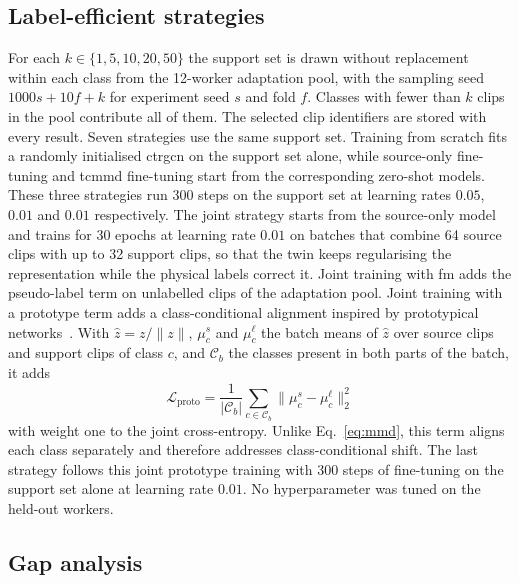 \documentclass[Afour,sagev,times]{sagej}
\begin{document}
\subsection{Label-efficient strategies}

For each $k\in\{1,5,10,20,50\}$ the support set is drawn without replacement
within each class from the 12-worker adaptation pool, with the sampling seed
$1000s+10f+k$ for experiment seed $s$ and fold $f$. Classes with fewer than $k$
clips in the pool contribute all of them. The selected clip identifiers are
stored with every result. Seven strategies use the same support set. Training
from scratch fits a randomly initialised \ac{ctrgcn} on the support set alone,
while source-only fine-tuning and \ac{tcmmd} fine-tuning start from the
corresponding zero-shot models. These three strategies run 300 steps on the
support set at learning rates $0.05$, $0.01$ and $0.01$ respectively. The
joint strategy starts from the source-only model and trains for 30 epochs at
learning rate $0.01$ on batches that combine 64 source clips with up to 32
support clips, so that the twin keeps regularising the representation while
the physical labels correct it. Joint training with \ac{fm} adds the
pseudo-label term on unlabelled clips of the adaptation pool. Joint training
with a prototype term adds a class-conditional alignment inspired by
prototypical networks~\cite{snell2017prototypical}. With $\hat{z}=z/\|z\|$,
$\mu_c^s$ and $\mu_c^\ell$ the batch means of $\hat{z}$ over source clips and
support clips of class $c$, and $\mathcal{C}_b$ the classes present in both
parts of the batch, it adds
\begin{equation}
  \mathcal{L}_{\mathrm{proto}}=\frac{1}{|\mathcal{C}_b|}\sum_{c\in\mathcal{C}_b}
  \bigl\|\mu_c^s-\mu_c^\ell\bigr\|_2^2
  \label{eq:proto}
\end{equation}
with weight one to the joint cross-entropy. Unlike Eq.~\ref{eq:mmd}, this term
aligns each class separately and therefore addresses class-conditional shift.
The last strategy follows this joint prototype training with 300 steps of
fine-tuning on the support set alone at learning rate $0.01$. No
hyperparameter was tuned on the held-out workers.

\subsection{Gap analysis}
\end{document}
